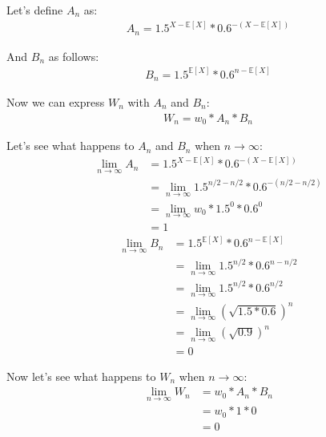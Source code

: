 \documentclass[12pt]{article}
\begin{document}
Let's define $A_n$ as:
\begin{align}
  \begin{equation*}
    A_n = 1.5^{X - \mathbb{E}[X]} * 0.6^{-(X - \mathbb{E}[X])}
  \end{equation*}
\end{align}

And $B_n$ as follows:
\begin{align}
  \begin{equation*}
    B_n = 1.5^{\mathbb{E}[X]} * 0.6^{n - \mathbb{E}[X]}
  \end{equation*}
\end{align}

Now we can express $W_n$ with $A_n$ and $B_n$:
\begin{align}
  \begin{equation*}
    W_n = w_0 * A_n * B_n
  \end{equation*}
\end{align}

Let's see what happens to $A_n$ and $B_n$ when $n \rightarrow \infty$:
\begin{equation*}
  \begin{split}
    \lim_{n\to\infty} A_n &=  1.5^{X - \mathbb{E}[X]} * 0.6^{-(X - \mathbb{E}[X])}\\
    &= \lim_{n\to\infty} 1.5^{n/2 - n/2} * 0.6^{- (n/2 - n/2)} \\
    &= \lim_{n\to\infty}w_0 * 1.5^0 * 0.6^0 \\
    & = 1
  \end{split}
\end{equation*}
\begin{equation*}
  \begin{split}
    \lim_{n\to\infty} B_n &=  1.5^{\mathbb{E}[X]} * 0.6^{n - \mathbb{E}[X]} \\
    &= \lim_{n\to\infty} 1.5^{n/2} * 0.6^{n - n/2} \\
    &= \lim_{n\to\infty} 1.5^{n/2} * 0.6^{n/2} \\
    &= \lim_{n\to\infty} (\sqrt{1.5*0.6})^{n}\\
    &= \lim_{n\to\infty} (\sqrt{0.9}) ^{n}\\
    &= 0
  \end{split}
\end{equation*}

Now let's see what happens to $W_n$ when $n \rightarrow \infty$:
\begin{equation*}
  \begin{split}
    \lim_{n\to\infty} W_n &= w_0 * A_n * B_n\\
    & = w_0 * 1 * 0 \\
    & = 0
  \end{split}
\end{equation*}
\end{document}
